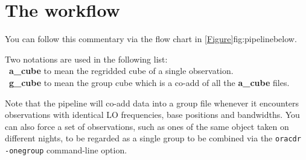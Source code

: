 \documentclass[11pt,oneside,chapters]{starlink}
\begin{document}
\newpage
\section{The workflow}
You can follow this commentary via the flow chart in
\cref{Figure}{fig:pipeline}{below}.

Two notations are used in the following list:\\
\textbullet\ \textbf{a\_cube} to mean the regridded cube of a single
observation. \\
\textbullet\ \textbf{g\_cube} to mean the group cube which is a co-add
of all the \textbf{a\_cube} files.

Note that the pipeline will co-add data into a group file whenever it
encounters observations with identical LO frequencies, base positions
and bandwidths.  You can also force a set of observations, such as
ones of the same object taken on different nights, to be regarded as
a single group to be combined via the \texttt{oracdr -onegroup}
command-line option.
\end{document}
